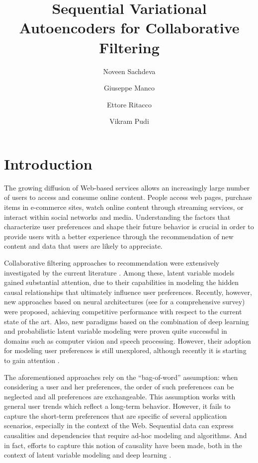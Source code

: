 \documentclass[sigconf]{acmart}
\title{Sequential Variational Autoencoders for Collaborative Filtering}
\author{Noveen Sachdeva}
\affiliation{   
	\institution{International Institute of Information Technology}
	\city{Hyderabad, India} 
}
\author{Giuseppe Manco}
\affiliation{\institution{ICAR-CNR}
   \streetaddress{Via Bucci, 8/9c}
   \city{Rende}
   \country{Italy}
   \postcode{87036}
 }
\author{Ettore Ritacco}
\affiliation{\institution{ICAR-CNR}
   \streetaddress{Via Bucci, 8/9c}
   \city{Rende}
   \state{Italy}
   \postcode{87036}
 }
\author{Vikram Pudi}
\affiliation{   
	\institution{International Institute of Information Technology}
	\city{Hyderabad, India}  
}
\numberwithin{equation}{section}
\begin{document}
\maketitle




\section{Introduction}
The growing diffusion of Web-based services allows an
increasingly large number of users to access and consume online
content. People access web pages, 
purchase items in e-commerce sites, watch online content through
streaming services, or interact within social networks and media. 
Understanding the factors that characterize user preferences
and shape their future behavior is crucial in order to provide
users with a better experience through the recommendation of new
content and data that users are likely to appreciate.


Collaborative filtering approaches to recommendation were extensively
investigated by the current literature
\cite{Aggarwal:2016:RST:2931100}. Among these, latent variable models   
\cite{Hofmann:2004,Ruslan:2008,Wang:2011,Kabbur:2013}
gained substantial attention, due to their capabilities in modeling
the hidden causal relationships that ultimately influence user
preferences.  Recently, however, new approaches based on neural
architectures (see \cite{ZhangYS17aa} for a comprehensive survey) were
proposed, achieving competitive performance with respect to the
current state of the art. Also, new paradigms based on the combination
of deep learning and
probabilistic latent variable modeling 
\cite{kingma14,RezendeMW14} were proven quite
successful in domains such as computer vision and speech
processing. However, their adoption for modeling user preferences is
still unexplored, although recently it is starting to gain attention
\cite{Liang:2018:VAC:3178876.3186150,Li:2017}.

The aforementioned approaches rely on the ``bag-of-word''
assumption: when considering a user and her preferences, the order of
such preferences can be neglected and all preferences are
exchangeable. This assumption works with general user trends which
reflect a long-term behavior. However, it fails to capture the
short-term preferences that are specific of several application
scenarios, especially in the context of the Web. Sequential
data can express causalities and dependencies
that require ad-hoc modeling and algorithms. And in fact, efforts to
capture this notion of causality have been made, both in the context of latent variable modeling
\cite{Rendle:2010,Barbieri:2013,Tavakol:2014,He:2017} and deep learning
\cite{Hidasi:2016,Devooght:2017,Wu:2017,Tang:2018}.  
\end{document}
